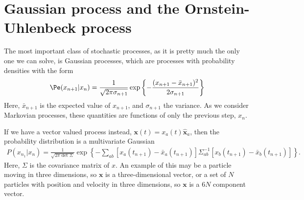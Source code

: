 \section{Gaussian process and the Ornstein-Uhlenbeck process}

The most important class of stochastic processes, as it is pretty much the only one we can solve, is Gaussian processes, which are processes with probability densities with the form
%
\begin{align}
    \Pe(x_{n+1}|x_n)
    =
    \frac{ 1 }{ \sqrt{ 2 \pi \sigma_{n+1} } }
    \exp \left\{ {-\frac{(x_{n+1} - \bar x_{n + 1})^2}{2 \sigma_{n+1} }} \right\}
\end{align}
%
Here, $\bar x_{n+1}$ is the expected value of $x_{n+1}$, and $\sigma_{n+1}$ the variance.
As we consider Markovian processes, these quantities are functions of only the previous step, $x_n$.


If we have a vector valued process instead, $\bm x(t) = x_a(t) \hat {\bm x}_a$, then the probability distribution is a multivariate Gaussian
%
\begin{align}
    P(x_{n_1}|x_n)
    = 
    \frac{ 1 }{ \sqrt{ 2 \pi \det \Sigma } }
    \exp \left\{ - \sum_{ab} \left[x_a(t_{n+1}) - \bar x_a(t_{n+1})\right] \Sigma_{ab}^{-1} \left[x_b(t_{n+1}) - \bar x_b(t_{n+1})\right] \right\}.
\end{align}
%
Here, $\Sigma$ is the covariance matrix of $x$.
An example of this may be a particle moving in three dimensions, so $\bm x$ is a three-dimensional vector, or a set of $N$ particles with position and velocity in three dimensions, so $\bm x$ is a $6 N$ component vector.


